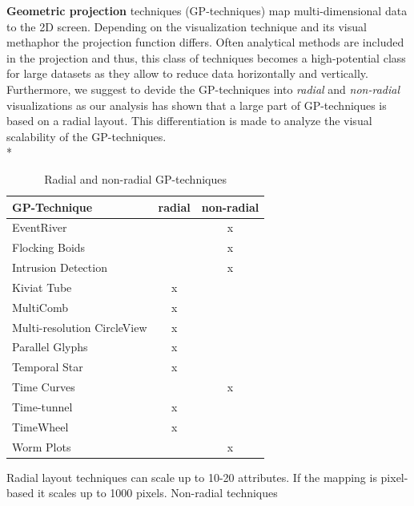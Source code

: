 \textbf{Geometric projection} techniques (GP-techniques) map multi-dimensional data to the 2D screen\cite{FerreiradeOliveira2003}. Depending on the visualization technique and its visual methaphor the projection function differs. Often analytical methods are included in the projection and thus, this class of techniques becomes a high-potential class for large datasets as they allow to reduce data horizontally and vertically.
Furthermore, we suggest to devide the GP-techniques into \textit{radial} and \textit{non-radial} visualizations\cite{Diehl2010} as our analysis has shown that a large part of GP-techniques is based on a radial layout. This differentiation is made to analyze the visual scalability of the GP-techniques.\\*

\begin{table}[th]
	\centering
	\caption[Table 1]{Radial and non-radial GP-techniques}
	\label{radialTable}
	\begin{tabu}{lcc}
	\toprule
	GP-Technique & radial & non-radial \\
	\midrule
	EventRiver &  & x \\
	Flocking Boids &  & x \\
	Intrusion Detection &  & x \\
	Kiviat Tube & x &  \\
	MultiComb & x &  \\
	Multi-resolution CircleView & x &  \\
	Parallel Glyphs & x &  \\
    Temporal Star & x &  \\
	Time Curves &  & x \\
	Time-tunnel & x & \\
	TimeWheel & x & \\
	Worm Plots &  & x\\
	\bottomrule
	\end{tabu}
\end{table}

Radial layout techniques can scale up to 10-20 attributes. If the mapping is pixel-based it scales up to 1000 pixels\cite{Jayaraman2002}. 
Non-radial techniques

